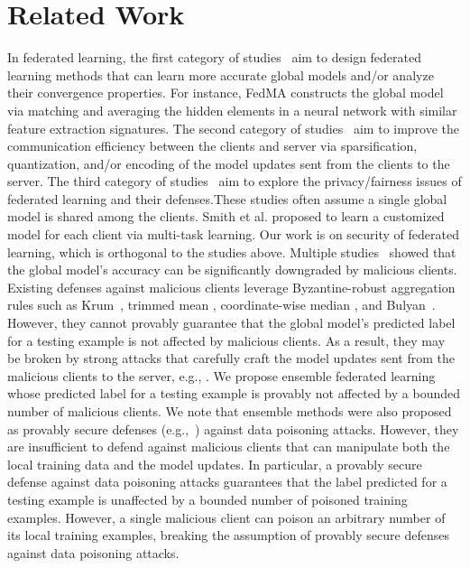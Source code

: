 \documentclass[letterpaper]{article} %
\begin{document}
\section{Related Work}
\vspace{-3.27mm}
In federated learning, the first category of studies~\cite{smith2017federated,li2019convergence,wang2020federated,liu2020federated,peng2019federated} aim to design  federated learning methods that can learn more accurate global models and/or analyze their convergence properties. For instance, FedMA \cite{wang2020federated} constructs the global model via matching and averaging the hidden elements in a neural network with similar feature extraction signatures. The second category of studies~\cite{konevcny2016federated,mcmahan2016communication,wen2017terngrad,alistarh2017qsgd,lee2017speeding,sahu2018convergence,bernstein2018signsgd,vogels2019powersgd,yurochkin2019bayesian,mohri2019agnostic,wang2020federated,li2020practical,li2020acceleration,hamer2020fedboost,rothchildfetchsgd,malinovsky2020local} aim to improve the communication efficiency between the clients and server via sparsification, quantization, and/or encoding of the model updates sent from the clients to the server. The third category of studies~\cite{bonawitz2017practical,geyer2017differentially,hitaj2017deep,melis2019exploiting,zhu2019deep,mohri2019agnostic,wang2020federatedlatent,Li2020Fair} aim to explore the privacy/fairness issues of federated learning and their defenses.These studies often assume a single global model is shared among the clients.  Smith et al. \cite{smith2017federated} proposed to learn a customized model for each client via multi-task learning.  Our work is on  security of federated learning, which is orthogonal to the studies above. Multiple studies~\cite{fang2019local,Bagdasaryan18,Xie19,Bhagoji19} showed that the  global model's accuracy can be significantly downgraded by malicious clients. Existing defenses against malicious clients leverage Byzantine-robust aggregation rules such as Krum~\cite{Blanchard17}, trimmed mean \cite{Yin18},  coordinate-wise median \cite{Yin18}, and Bulyan~\cite{Mhamdi18}. However, they cannot provably guarantee that the global model's predicted label for a testing example is not affected by malicious clients. As a result, they may be broken by strong attacks that carefully craft the model updates sent from the malicious clients to the server, e.g., \cite{fang2019local}. We propose ensemble federated learning whose predicted label for a testing example is provably not affected by a bounded number of malicious clients.  We note that ensemble methods were also proposed as provably secure defenses (e.g.,~\cite{jia2020intrinsic}) against data poisoning attacks. However, they are insufficient to defend against malicious clients that can manipulate both the local training data and the model updates. In particular, a provably secure defense against data poisoning attacks guarantees that the label predicted for a testing example is unaffected by a bounded number of poisoned training examples. However, a single malicious client can poison an arbitrary number of its local training examples, breaking the assumption of provably secure defenses against data poisoning attacks.
\end{document}
